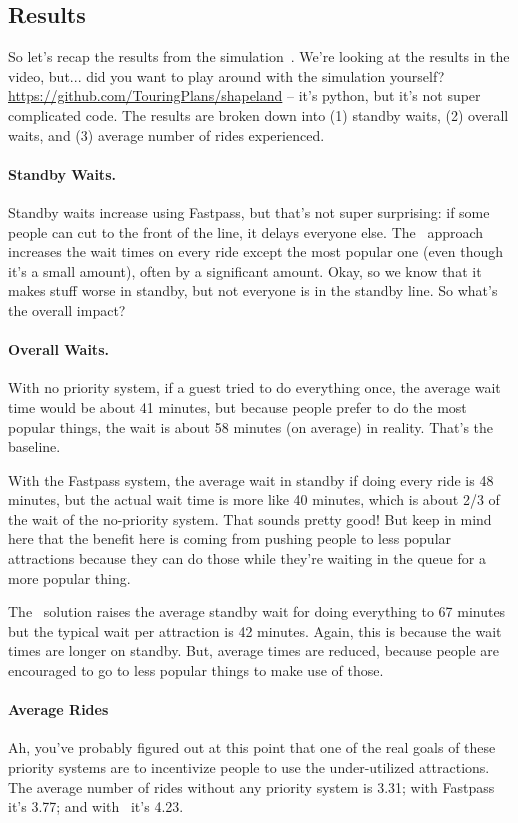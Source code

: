 \documentclass[a4paper]{report}
\begin{document}
\subsection*{Results}
So let's recap the results from the simulation~\cite{dldisney}. We're looking at the results in the video, but... did you want to play around with the simulation yourself? \url{https://github.com/TouringPlans/shapeland} -- it's python, but it's not super complicated code. The results are broken down into (1) standby waits, (2) overall waits, and (3) average number of rides experienced. 

\paragraph{Standby Waits.}
Standby waits increase using Fastpass, but that's not super surprising: if some people can cut to the front of the line, it delays everyone else. The \FPP~approach increases the wait times on every ride except the most popular one (even though it's a small amount), often by a significant amount. Okay, so we know that it makes stuff worse in standby, but not everyone is in the standby line. So what's the overall impact?

\paragraph{Overall Waits.}

With no priority system, if a guest tried to do everything once, the average wait time would be about 41 minutes, but because people prefer to do the most popular things, the wait is about 58 minutes (on average) in reality. That's the baseline.

With the Fastpass system, the average wait in standby if doing every ride is 48 minutes, but the actual wait time is more like 40 minutes, which is about 2/3 of the wait of the no-priority system. That sounds pretty good! But keep in mind here that the benefit here is coming from pushing people to less popular attractions because they can do those while they're waiting in the queue for a more popular thing. 

The \FPP~solution raises the average standby wait for doing everything to 67 minutes but the typical wait per attraction is 42 minutes. Again, this is because the wait times are longer on standby. But, average times are reduced, because people are encouraged to go to less popular things to make use of those.

\paragraph{Average Rides}
Ah, you've probably figured out at this point that one of the real goals of these priority systems are to incentivize people to use the under-utilized attractions. The average number of rides without any priority system is 3.31; with Fastpass it's 3.77; and with \FPP~it's 4.23. 
\end{document}
